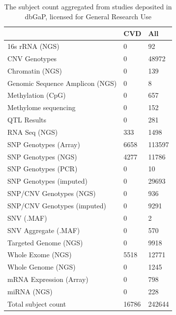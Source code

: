 \documentclass[letter]{bioinfo}
\begin{document}
\begin{table}[]
	\caption{The subject count aggregated from studies deposited in dbGaP, licensed for General Research Use}
	\label{tab:dbgapSubject}
	\begin{tabular}{l l l}
		\toprule
		& \textbf{CVD} &  \textbf{All}                         \\ \midrule
		16s rRNA (NGS)                 &     0 &      92 \\
		CNV Genotypes                  &     0 &   48972 \\
		Chromatin (NGS)                &     0 &     139 \\
		Genomic Sequence Amplicon (NGS)&     0 &       8 \\
		Methylation (CpG)              &     0 &     657 \\
		Methylome sequencing           &     0 &     152 \\
		QTL Results                    &     0 &     281 \\
		RNA Seq (NGS)                  &   333 &    1498 \\
		SNP Genotypes (Array)          &  6658 &  113597 \\
		SNP Genotypes (NGS)            &  4277 &   11786 \\
		SNP Genotypes (PCR)            &     0 &      10 \\
		SNP Genotypes (imputed)        &     0 &   29693 \\
		SNP/CNV Genotypes (NGS)        &     0 &     936 \\
		SNP/CNV Genotypes (imputed)    &     0 &    9291 \\
		SNV (.MAF)                     &     0 &       2 \\
		SNV Aggregate (.MAF)           &     0 &     570 \\
		Targeted Genome (NGS)          &     0 &    9918 \\
		Whole Exome (NGS)              &  5518 &   12771 \\
		Whole Genome (NGS)             &     0 &    1245 \\
		mRNA Expression (Array)        &     0 &     798 \\
		miRNA (NGS)                        & 0 &   228 \\ \hline
		Total subject count & 16786 & 242644 \\ 
	\end{tabular}
\end{table}
\end{document}
